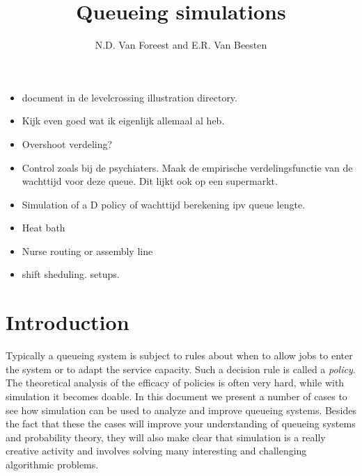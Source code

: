 \documentclass{scrartcl}
\title{Queueing simulations}
\author{N.D. Van Foreest and E.R. Van Beesten}
\begin{document}
\maketitle
\tableofcontents

\begin{itemize}
\item document in de levelcrossing illustration directory. 
\item Kijk even goed wat ik eigenlijk allemaal al heb.
\item Overshoot verdeling? 
\item Control zoals bij de psychiaters. Maak de empirische verdelingsfunctie van de wachttijd voor deze queue. Dit lijkt ook op een supermarkt. 
\item Simulation of a D policy of wachttijd berekening ipv queue lengte.
\item Heat bath
\item Nurse routing or assembly line
\item shift sheduling. setups. 
\end{itemize}


\section{Introduction}

Typically a queueing system is subject to rules about when to allow jobs to enter the system or to adapt the service capacity.
Such a decision rule is called a \emph{policy}.
The theoretical analysis of the efficacy of policies is often very hard, while with simulation it becomes doable.
In this document we present a number of cases to see how simulation can be used to analyze and improve queueing systems.
Besides the fact that these the cases will improve your understanding of queueing systems and probability theory, they will also make clear that simulation is a really creative activity and involves solving many interesting and challenging algorithmic problems.
\end{document}
